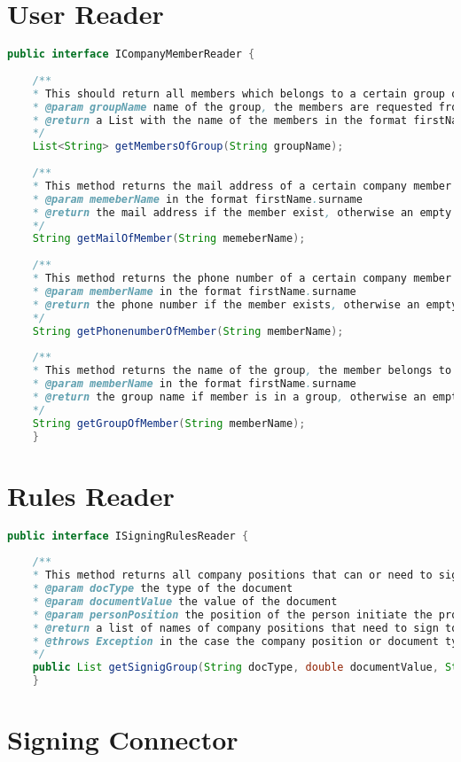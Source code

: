 \section{User Reader}
\begin{lstlisting}[language=Java]
	public interface ICompanyMemberReader {
	
	/**
	* This should return all members which belongs to a certain group of the company
	* @param groupName name of the group, the members are requested from
	* @return a List with the name of the members in the format firstName.surname, in the case the group does not exist an empty list
	*/
	List<String> getMembersOfGroup(String groupName);
	
	/**
	* This method returns the mail address of a certain company member
	* @param memeberName in the format firstName.surname
	* @return the mail address if the member exist, otherwise an empty string
	*/
	String getMailOfMember(String memeberName);
	
	/**
	* This method returns the phone number of a certain company member
	* @param memberName in the format firstName.surname
	* @return the phone number if the member exists, otherwise an empty string
	*/
	String getPhonenumberOfMember(String memberName);
	
	/**
	* This method returns the name of the group, the member belongs to
	* @param memberName in the format firstName.surname
	* @return the group name if member is in a group, otherwise an empty string
	*/
	String getGroupOfMember(String memberName);
	}
\end{lstlisting}

\section{Rules Reader}
\begin{lstlisting}[language=Java]
	public interface ISigningRulesReader {
	
	/**
	* This method returns all company positions that can or need to sign along with the initiator of the signing process.
	* @param docType the type of the document
	* @param documentValue the value of the document
	* @param personPosition the position of the person initiate the process
	* @return a list of names of company positions that need to sign together with the initiator
	* @throws Exception in the case the company position or document type does not exists. Furthermore, if there is no range available for that combination
	*/
	public List getSignigGroup(String docType, double documentValue, String personPosition) throws Exception;
	}
\end{lstlisting}

\section{Signing Connector}
\begin{lstlisting}[language=Java]

\end{lstlisting}